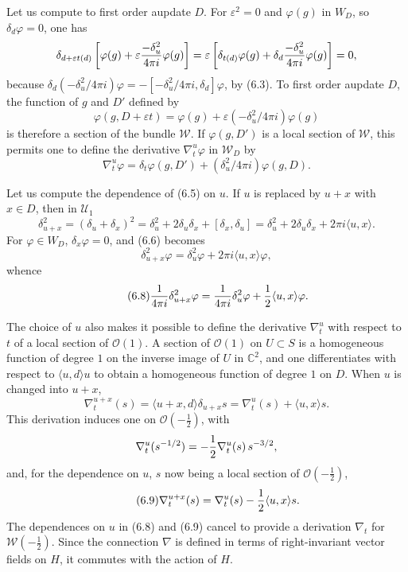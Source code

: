 \documentclass[11pt]{article}
\newcommand{\C}{\mathbb C}
\newcommand{\cO}{\mathcal O}
\newcommand{\cW}{\mathcal W}
\newcommand{\half}{\tfrac12}
\begin{document}
Let us compute to first order aupdate $D$. For $\varepsilon^2=0$ and $\varphi(g)$ in $W_D$, so $\delta_d\varphi=0$, one has
\[
\delta_{d+\varepsilon t(d)}\left[\varphi(g)+\varepsilon{-\delta_u^2\over4\pi i}\varphi(g)\right]
=\varepsilon\left[\delta_{t(d)}\varphi(g)+\delta_d{-\delta_u^2\over4\pi i}\varphi(g)\right]=0,
\]
because $\delta_d(-\delta_u^2/4\pi i)\varphi=-[-\delta_u^2/4\pi i,\delta_d]\varphi$, by (6.3). To first order aupdate $D$, the function of $g$ and $D'$ defined by
\[
\varphi(g,D+\varepsilon t)=\varphi(g)+\varepsilon(-\delta_u^2/4\pi i)\varphi(g)
\]
is therefore a section of the bundle $\cW$. If $\varphi(g,D')$ is a local section of $\cW$, this permits one to define the derivative $\nabla^u_t\varphi$ in $\cW_D$ by
\begin{equation}\tag{6.5}
\nabla^u_t\varphi=\delta_t\varphi(g,D')+(\delta_u^2/4\pi i)\varphi(g,D).
\end{equation}

Let us compute the dependence of (6.5) on $u$. If $u$ is replaced by $u+x$ with $x\in D$, then in $\mathcal U_1$
\begin{equation}\tag{6.6}
\delta_{u+x}^2=(\delta_u+\delta_x)^2=\delta_u^2+2\delta_u\delta_x+[\delta_x,\delta_u]
=\delta_u^2+2\delta_u\delta_x+2\pi i\langle u,x\rangle.
\end{equation}
For $\varphi\in W_D$, $\delta_x\varphi=0$, and (6.6) becomes
\begin{equation}\tag{6.7}
\delta_{u+x}^2\varphi=\delta_u^2\varphi+2\pi i\langle u,x\rangle\varphi,
\end{equation}
whence
\begin{equation}\tag{6.8}
{1\over4\pi i}\delta_{u+x}^2\varphi={1\over4\pi i}\delta_u^2\varphi+{1\over2}\langle u,x\rangle\varphi.
\end{equation}

The choice of $u$ also makes it possible to define the derivative $\nabla^u_t$ with respect to $t$ of a local section of $\cO(1)$. A section of $\cO(1)$ on $U\subset S$ is a homogeneous function of degree $1$ on the inverse image of $U$ in $\C^2$, and one differentiates with respect to $\langle u,d\rangle u$ to obtain a homogeneous function of degree $1$ on $D$. When $u$ is changed into $u+x$,
\[
\nabla^{u+x}_t(s)=\langle u+x,d\rangle\delta_{u+x}s
=\nabla^u_t(s)+\langle u,x\rangle s.
\]
This derivation induces one on $\cO(-\half)$, with
\[
\nabla^u_t(s^{-1/2})=-{1\over2}\nabla^u_t(s)\,s^{-3/2},
\]
and, for the dependence on $u$, $s$ now being a local section of $\cO(-\half)$,
\begin{equation}\tag{6.9}
\nabla^{u+x}_t(s)=\nabla^u_t(s)-{1\over2}\langle u,x\rangle s.
\end{equation}
The dependences on $u$ in (6.8) and (6.9) cancel to provide a derivation $\nabla_t$ for $\cW(-\half)$. Since the connection $\nabla$ is defined in terms of right-invariant vector fields on $H$, it commutes with the action of $H$.
\end{document}
